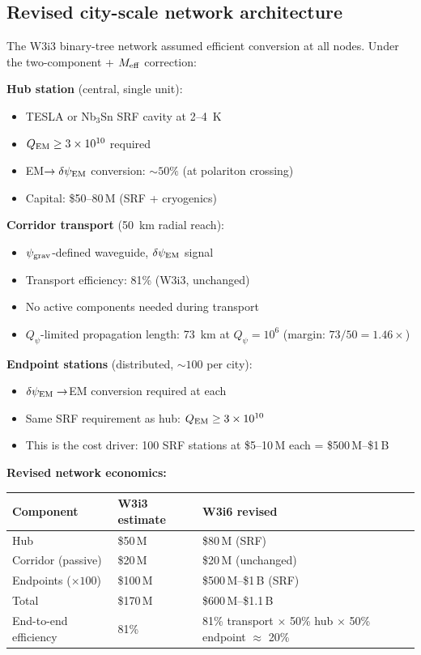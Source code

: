 \documentclass[11pt]{article}
\newcommand{\ee}[1]{\times 10^{#1}}
\newcommand{\psigrav}{\psi_{\rm grav}}
\newcommand{\dpsiEM}{\delta\psi_{\rm EM}}
\newcommand{\Meff}{M_{\rm eff}}
\newcommand{\Qpsi}{Q_\psi}
\begin{document}
\subsection{Revised city-scale network architecture}

The W3i3 binary-tree network assumed efficient conversion at all nodes.
Under the two-component + $\Meff$ correction:

\begin{tcolorbox}[colback=blue!5!white, colframe=blue!60!black,
  title=\textbf{W3i6 City-Scale Network: Revised Architecture}]

\textbf{Hub station} (central, single unit):
\begin{itemize}[nosep]
  \item TESLA or Nb$_3$Sn SRF cavity at 2--4~K
  \item $Q_{\rm EM} \geq 3\ee{10}$ required
  \item EM$\to\dpsiEM$ conversion: $\sim 50\%$ (at polariton crossing)
  \item Capital: \$50--80\,M (SRF + cryogenics)
\end{itemize}

\textbf{Corridor transport} (50~km radial reach):
\begin{itemize}[nosep]
  \item $\psigrav$-defined waveguide, $\dpsiEM$ signal
  \item Transport efficiency: 81\% (W3i3, unchanged)
  \item No active components needed during transport
  \item $\Qpsi$-limited propagation length: 73~km at $\Qpsi = 10^6$
    (margin: $73/50 = 1.46\times$)
\end{itemize}

\textbf{Endpoint stations} (distributed, $\sim 100$ per city):
\begin{itemize}[nosep]
  \item $\dpsiEM\to$EM conversion required at each
  \item Same SRF requirement as hub: $Q_{\rm EM} \geq 3\ee{10}$
  \item This is the cost driver: 100 SRF stations at \$5--10\,M each
    = \$500\,M--\$1\,B
\end{itemize}

\textbf{Revised network economics:}
\begin{center}
\begin{tabular}{lll}
\toprule
Component & W3i3 estimate & W3i6 revised \\
\midrule
Hub & \$50\,M & \$80\,M (SRF) \\
Corridor (passive) & \$20\,M & \$20\,M (unchanged) \\
Endpoints ($\times 100$) & \$100\,M & \$500\,M--\$1\,B (SRF) \\
Total & \$170\,M & \$600\,M--\$1.1\,B \\
End-to-end efficiency & 81\% & 81\% transport $\times$ 50\% hub
  $\times$ 50\% endpoint $\approx$ 20\% \\
\bottomrule
\end{tabular}
\end{center}
\end{tcolorbox}
\end{document}
